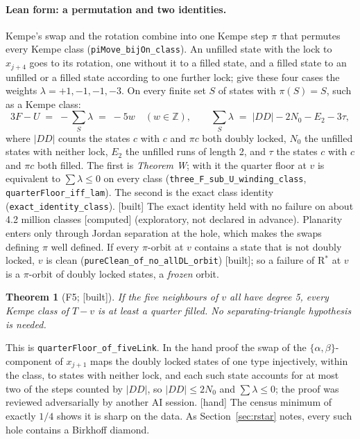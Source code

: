 \documentclass[11pt]{article}
\newtheorem{theorem}{Theorem}\newtheorem{lemma}{Lemma}\newtheorem{conjecture}{Conjecture}
\newcommand{\lab}[1]{\textsf{[#1]}}
\begin{document}
\paragraph{Lean form: a permutation and two identities.} Kempe's swap and the rotation combine into one Kempe step $\pi$ that permutes every Kempe class (\texttt{piMove\_bijOn\_class}). An unfilled state with the lock to $x_{j+4}$ goes to its rotation, one without it to a filled state, and a filled state to an unfilled or a filled state according to one further lock; give these four cases the weights $\lambda=+1,-1,-1,-3$. On every finite set $S$ of states with $\pi(S)=S$, such as a Kempe class:
\[3F-U\;=\;-\sum_{S}\lambda\;=\;-5w\quad(w\in\mathbb Z),\qquad \sum_{S}\lambda\;=\;|DD|-2N_0-E_2-3\tau,\]
where $|DD|$ counts the states $c$ with $c$ and $\pi c$ both doubly locked, $N_0$ the unfilled states with neither lock, $E_2$ the unfilled runs of length 2, and $\tau$ the states $c$ with $c$ and $\pi c$ both filled. The first is \emph{Theorem W}; with it the quarter floor at $v$ is equivalent to $\sum\lambda\le0$ on every class (\texttt{three\_F\_sub\_U\_winding\_class}, \texttt{quarterFloor\_iff\_lam}). The second is the exact class identity (\texttt{exact\_identity\_class}). \lab{built} The exact identity held with no failure on about 4.2 million classes \lab{computed} (exploratory, not declared in advance). Planarity enters only through Jordan separation at the hole, which makes the swaps defining $\pi$ well defined. If every $\pi$-orbit at $v$ contains a state that is not doubly locked, $v$ is clean (\texttt{pureClean\_of\_no\_allDL\_orbit}) \lab{built}; so a failure of R$^\ast$ at $v$ is a $\pi$-orbit of doubly locked states, a \emph{frozen} orbit.

\begin{theorem}[F5; \lab{built}]\label{thm:F5}
If the five neighbours of $v$ all have degree 5, every Kempe class of $T-v$ is at least a quarter filled. No separating-triangle hypothesis is needed.
\end{theorem}
This is \texttt{quarterFloor\_of\_fiveLink}. In the hand proof the swap of the $\{\alpha,\beta\}$-component of $x_{j+1}$ maps the doubly locked states of one type injectively, within the class, to states with neither lock, and each such state accounts for at most two of the steps counted by $|DD|$, so $|DD|\le2N_0$ and $\sum\lambda\le0$; the proof was reviewed adversarially by another AI session. \lab{hand} The census minimum of exactly $1/4$ shows it is sharp on the data. As Section~\ref{sec:rstar} notes, every such hole contains a Birkhoff diamond.
\end{document}
